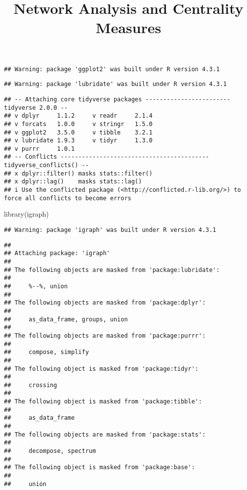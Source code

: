 \documentclass[
]{article}
\title{Network Analysis and Centrality Measures}
\author{}
\date{\vspace{-2.5em}}
\newenvironment{Shaded}{\begin{snugshade}}{\end{snugshade}}
\newcommand{\AttributeTok}[1]{\textcolor[rgb]{0.77,0.63,0.00}{#1}}
\newcommand{\ConstantTok}[1]{\textcolor[rgb]{0.00,0.00,0.00}{#1}}
\newcommand{\FunctionTok}[1]{\textcolor[rgb]{0.00,0.00,0.00}{#1}}
\newcommand{\NormalTok}[1]{#1}
\newcommand{\SpecialCharTok}[1]{\textcolor[rgb]{0.00,0.00,0.00}{#1}}
\begin{document}
\maketitle

\begin{Shaded}
\end{Shaded}

\begin{verbatim}
## Warning: package 'ggplot2' was built under R version 4.3.1
\end{verbatim}

\begin{verbatim}
## Warning: package 'lubridate' was built under R version 4.3.1
\end{verbatim}

\begin{verbatim}
## -- Attaching core tidyverse packages ------------------------ tidyverse 2.0.0 --
## v dplyr     1.1.2     v readr     2.1.4
## v forcats   1.0.0     v stringr   1.5.0
## v ggplot2   3.5.0     v tibble    3.2.1
## v lubridate 1.9.3     v tidyr     1.3.0
## v purrr     1.0.1     
## -- Conflicts ------------------------------------------ tidyverse_conflicts() --
## x dplyr::filter() masks stats::filter()
## x dplyr::lag()    masks stats::lag()
## i Use the conflicted package (<http://conflicted.r-lib.org/>) to force all conflicts to become errors
\end{verbatim}

\begin{Shaded}
\begin{Highlighting}[]
\FunctionTok{library}\NormalTok{(igraph)}
\end{Highlighting}
\end{Shaded}

\begin{verbatim}
## Warning: package 'igraph' was built under R version 4.3.1
\end{verbatim}

\begin{verbatim}
## 
## Attaching package: 'igraph'
## 
## The following objects are masked from 'package:lubridate':
## 
##     %--%, union
## 
## The following objects are masked from 'package:dplyr':
## 
##     as_data_frame, groups, union
## 
## The following objects are masked from 'package:purrr':
## 
##     compose, simplify
## 
## The following object is masked from 'package:tidyr':
## 
##     crossing
## 
## The following object is masked from 'package:tibble':
## 
##     as_data_frame
## 
## The following objects are masked from 'package:stats':
## 
##     decompose, spectrum
## 
## The following object is masked from 'package:base':
## 
##     union
\end{verbatim}
\end{document}
